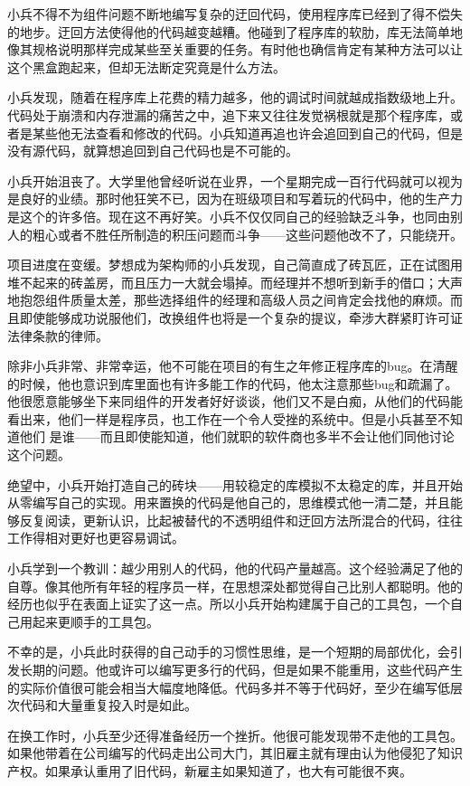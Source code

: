\documentclass[12pt,oneside]{book}
\begin{document}
小兵不得不为组件问题不断地编写复杂的迂回代码，使用程序库已经到了得不偿失的地步。迂回方法使得他的代码越变越糟。他碰到了程序库的软肋，库无法简单地像其规格说明那样完成某些至关重要的任务。有时他也确信肯定有某种方法可以让这个黑盒跑起来，但却无法断定究竟是什么方法。

小兵发现，随着在程序库上花费的精力越多，他的调试时间就越成指数级地上升。代码处于崩溃和内存泄漏的痛苦之中，追下来又往往发觉祸根就是那个程序库，或者是某些他无法查看和修改的代码。小兵知道再追也许会追回到自己的代码，但是没有源代码，就算想追回到自己代码也是不可能的。

小兵开始沮丧了。大学里他曾经听说在业界，一个星期完成一百行代码就可以视为是良好的业绩。那时他狂笑不已，因为在班级项目和写着玩的代码中，他的生产力是这个的许多倍。现在这不再好笑。小兵不仅仅同自己的经验缺乏斗争，也同由别人的粗心或者不胜任所制造的积压问题而斗争——这些问题他改不了，只能绕开。

项目进度在变缓。梦想成为架构师的小兵发现，自己简直成了砖瓦匠，正在试图用堆不起来的砖盖房，而且压力一大就会塌掉。而经理并不想听到新手的借口；大声地抱怨组件质量太差，那些选择组件的经理和高级人员之间肯定会找他的麻烦。而且即使能够成功说服他们，改换组件也将是一个复杂的提议，牵涉大群紧盯许可证法律条款的律师。

除非小兵非常、非常幸运，他不可能在项目的有生之年修正程序库的bug。在清醒的时候，他也意识到库里面也有许多能工作的代码，他太注意那些bug和疏漏了。他很愿意能够坐下来同组件的开发者好好谈谈，他们又不是白痴，从他们的代码能看出来，他们一样是程序员，也工作在一个令人受挫的系统中。但是小兵甚至不知道他们
是谁——而且即使能知道，他们就职的软件商也多半不会让他们同他讨论这个问题。

绝望中，小兵开始打造自己的砖块——用较稳定的库模拟不太稳定的库，并且开始从零编写自己的实现。用来置换的代码是他自己的，思维模式他一清二楚，并且能够反复阅读，更新认识，比起被替代的不透明组件和迂回方法所混合的代码，往往工作得相对更好也更容易调试。

小兵学到一个教训：越少用别人的代码，他的代码产量越高。这个经验满足了他的自尊。像其他所有年轻的程序员一样，在思想深处都觉得自己比别人都聪明。他的经历也似乎在表面上证实了这一点。所以小兵开始构建属于自己的工具包，一个自己用起来更顺手的工具包。

不幸的是，小兵此时获得的自己动手的习惯性思维，是一个短期的局部优化，会引发长期的问题。他或许可以编写更多行的代码，但是如果不能重用，这些代码产生的实际价值很可能会相当大幅度地降低。代码多并不等于代码好，至少在编写低层次代码和大量重复投入时是如此。

在换工作时，小兵至少还得准备经历一个挫折。他很可能发现带不走他的工具包。如果他带着在公司编写的代码走出公司大门，其旧雇主就有理由认为他侵犯了知识产权。如果承认重用了旧代码，新雇主如果知道了，也大有可能很不爽。
\end{document}

